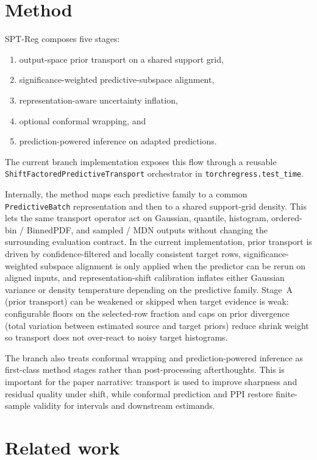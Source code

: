 \documentclass{article}
\begin{document}
\section{Method}

SPT-Reg composes five stages:
\begin{enumerate}
  \item output-space prior transport on a shared support grid,
  \item significance-weighted predictive-subspace alignment,
  \item representation-aware uncertainty inflation,
  \item optional conformal wrapping, and
  \item prediction-powered inference on adapted predictions.
\end{enumerate}

The current branch implementation exposes this flow through a reusable
\texttt{ShiftFactoredPredictiveTransport} orchestrator in
\texttt{torchregress.test\_time}.

Internally, the method maps each predictive family to a common
\texttt{PredictiveBatch} representation and then to a shared support-grid
density. This lets the same transport operator act on Gaussian, quantile,
histogram, ordered-bin / BinnedPDF, and sampled / MDN outputs without changing
the surrounding evaluation contract. In the current implementation, prior
transport is driven by confidence-filtered and locally consistent target rows,
significance-weighted subspace alignment is only applied when the predictor can
be rerun on aligned inputs, and representation-shift calibration inflates
either Gaussian variance or density temperature depending on the predictive
family. Stage~A (prior transport) can be weakened or skipped when target
evidence is weak: configurable floors on the selected-row fraction and caps on
prior divergence (total variation between estimated source and target priors)
reduce shrink weight so transport does not over-react to noisy target histograms.

The branch also treats conformal wrapping and prediction-powered inference as
first-class method stages rather than post-processing afterthoughts. This is
important for the paper narrative: transport is used to improve sharpness and
residual quality under shift, while conformal prediction and PPI restore
finite-sample validity for intervals and downstream estimands.

\section{Related work}
\end{document}
